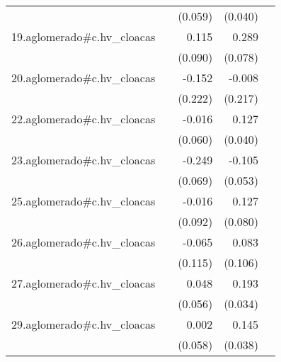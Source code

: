 {\begin{longtable}{l*{4}{D{.}{.}{-1}}}
            &                     &     (0.059)         &     (0.040)         &                     \\
\addlinespace
19.aglomerado#c.hv\_cloacas&                     &       0.115         &       0.289\sym{***}&                     \\
            &                     &     (0.090)         &     (0.078)         &                     \\
\addlinespace
20.aglomerado#c.hv\_cloacas&                     &      -0.152         &      -0.008         &                     \\
            &                     &     (0.222)         &     (0.217)         &                     \\
\addlinespace
22.aglomerado#c.hv\_cloacas&                     &      -0.016         &       0.127\sym{**} &                     \\
            &                     &     (0.060)         &     (0.040)         &                     \\
\addlinespace
23.aglomerado#c.hv\_cloacas&                     &      -0.249\sym{***}&      -0.105\sym{*}  &                     \\
            &                     &     (0.069)         &     (0.053)         &                     \\
\addlinespace
25.aglomerado#c.hv\_cloacas&                     &      -0.016         &       0.127         &                     \\
            &                     &     (0.092)         &     (0.080)         &                     \\
\addlinespace
26.aglomerado#c.hv\_cloacas&                     &      -0.065         &       0.083         &                     \\
            &                     &     (0.115)         &     (0.106)         &                     \\
\addlinespace
27.aglomerado#c.hv\_cloacas&                     &       0.048         &       0.193\sym{***}&                     \\
            &                     &     (0.056)         &     (0.034)         &                     \\
\addlinespace
29.aglomerado#c.hv\_cloacas&                     &       0.002         &       0.145\sym{***}&                     \\
            &                     &     (0.058)         &     (0.038)         &                     \\

\end{longtable}}
